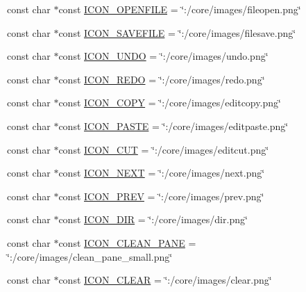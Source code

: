 \begin{DoxyCompactItemize}
\item 
const char $\ast$const \hyperlink{group___core_plugin_gaaf4ebf7397607bf9b24a0d026240f1e9}{\-I\-C\-O\-N\-\_\-\-O\-P\-E\-N\-F\-I\-L\-E} = \char`\"{}\-:/core/images/fileopen.\-png\char`\"{}
\item 
const char $\ast$const \hyperlink{group___core_plugin_gadf634b2efa7db99bcc3059667b21f309}{\-I\-C\-O\-N\-\_\-\-S\-A\-V\-E\-F\-I\-L\-E} = \char`\"{}\-:/core/images/filesave.\-png\char`\"{}
\item 
const char $\ast$const \hyperlink{group___core_plugin_gabe57fe99b37c20c83b1076cf2ee8f962}{\-I\-C\-O\-N\-\_\-\-U\-N\-D\-O} = \char`\"{}\-:/core/images/undo.\-png\char`\"{}
\item 
const char $\ast$const \hyperlink{group___core_plugin_ga5790e2eaef746c0c5f24032e09413721}{\-I\-C\-O\-N\-\_\-\-R\-E\-D\-O} = \char`\"{}\-:/core/images/redo.\-png\char`\"{}
\item 
const char $\ast$const \hyperlink{group___core_plugin_ga1aa8b94ac7d79f0f11134c497e272d21}{\-I\-C\-O\-N\-\_\-\-C\-O\-P\-Y} = \char`\"{}\-:/core/images/editcopy.\-png\char`\"{}
\item 
const char $\ast$const \hyperlink{group___core_plugin_ga41f876884627c908da22fb2839b7647a}{\-I\-C\-O\-N\-\_\-\-P\-A\-S\-T\-E} = \char`\"{}\-:/core/images/editpaste.\-png\char`\"{}
\item 
const char $\ast$const \hyperlink{group___core_plugin_gab11796caa2887911728f7c3830344151}{\-I\-C\-O\-N\-\_\-\-C\-U\-T} = \char`\"{}\-:/core/images/editcut.\-png\char`\"{}
\item 
const char $\ast$const \hyperlink{group___core_plugin_gaf7d00a706b67895a45a1c9638e051693}{\-I\-C\-O\-N\-\_\-\-N\-E\-X\-T} = \char`\"{}\-:/core/images/next.\-png\char`\"{}
\item 
const char $\ast$const \hyperlink{group___core_plugin_gab369e93f9c88bd1843fb04b69231e36b}{\-I\-C\-O\-N\-\_\-\-P\-R\-E\-V} = \char`\"{}\-:/core/images/prev.\-png\char`\"{}
\item 
const char $\ast$const \hyperlink{group___core_plugin_gaae28f0cb902b7d5e3b672b7d2a15b68e}{\-I\-C\-O\-N\-\_\-\-D\-I\-R} = \char`\"{}\-:/core/images/dir.\-png\char`\"{}
\item 
const char $\ast$const \hyperlink{group___core_plugin_ga12e00a8078139b88e0be34566a87cdcc}{\-I\-C\-O\-N\-\_\-\-C\-L\-E\-A\-N\-\_\-\-P\-A\-N\-E} = \char`\"{}\-:/core/images/clean\-\_\-pane\-\_\-small.\-png\char`\"{}
\item 
const char $\ast$const \hyperlink{group___core_plugin_gaba4bc39566611b656f779c8a25e5ca32}{\-I\-C\-O\-N\-\_\-\-C\-L\-E\-A\-R} = \char`\"{}\-:/core/images/clear.\-png\char`\"{}

\end{DoxyCompactItemize}
